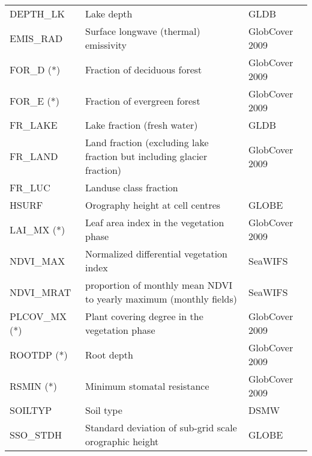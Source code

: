 \begin{longtable}{p{2.5cm}p{8.5cm}p{3.3cm}}
  DEPTH\_LK                             & Lake depth                                      &        \gls{GLDB}               \\
  EMIS\_RAD                             & Surface longwave (thermal) emissivity           &        \gls{GlobCover 2009}     \\               
  FOR\_D  (*)                           & Fraction of deciduous forest                    &        \gls{GlobCover 2009}     \\
  FOR\_E  (*)                           & Fraction of evergreen forest                    &        \gls{GlobCover 2009}     \\
  FR\_LAKE                              & Lake fraction (fresh water)                     &        \gls{GLDB}               \\                     
  FR\_LAND                              & Land fraction (excluding lake fraction but including glacier fraction) & \gls{GlobCover 2009}   \\
  FR\_LUC                               & Landuse class fraction                          &                           \\
  HSURF                                 & Orography height at cell centres                &        \gls{GLOBE}        \\
  LAI\_MX  (*)                          & Leaf area index in the vegetation phase         &        \gls{GlobCover 2009}     \\
  NDVI\_MAX                             & Normalized differential vegetation index        &        \gls{SeaWIFS}            \\
  NDVI\_MRAT                            & proportion of monthly mean NDVI to yearly maximum (monthly fields)&  \gls{SeaWIFS} \\
  PLCOV\_MX  (*)                        & Plant covering degree in the vegetation phase   &        \gls{GlobCover 2009}     \\
  ROOTDP (*)                            & Root depth                                      &        \gls{GlobCover 2009}     \\
  RSMIN  (*)                            & Minimum stomatal resistance                     &        \gls{GlobCover 2009}     \\
  SOILTYP                               & Soil type                                       &        \gls{DSMW}               \\
  SSO\_STDH                             & Standard deviation of sub-grid scale orographic height  &   \gls{GLOBE}     \\

\end{longtable}
